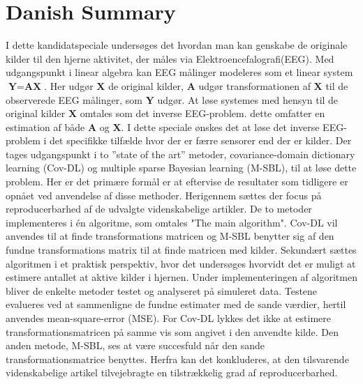 \chapter*{Danish Summary}
I dette kandidatspeciale undersøges det hvordan man kan genskabe de originale kilder til den hjerne aktivitet, der måles via Elektroencefalografi(EEG). Med udgangspunkt i linear algebra kan EEG målinger modeleres som et linear system $\textbf{Y}=\textbf{AX}$. Her udgør $\textbf{X}$ de original kilder, $\textbf{A}$ udgør transformationen af $\textbf{X}$ til de observerede EEG målinger, som $\textbf{Y}$ udgør.   
At løse systemes med hensyn til de original kilder $\textbf{X}$
omtales som det inverse EEG-problem. dette omfatter en estimation af både $\textbf{A}$ og $\textbf{X}$.
I dette speciale ønskes det at løse det inverse EEG-problem i det specifikke tilfælde hvor der er færre sensorer end der er kilder.  Der tages udgangspunkt i to ”state of the art” metoder, covariance-domain dictionary learning (Cov-DL) og multiple sparse Bayesian learning (M-SBL), til at løse dette problem. Her er det primære formål er at eftervise de resultater som tidligere er opnået ved anvendelse af disse methoder. Herigennem sættes der focus på reproducerbarhed af de udvalgte videnskabelige artikler.  
De to metoder implementeres i én algoritme, som omtales "The main algorithm". 
Cov-DL vil anvendes til at finde transformations matricen og M-SBL benytter sig af den fundne transformations matrix til at finde matricen med kilder. 
Sekundært sættes algoritmen i et praktisk perspektiv, hvor det undersøges hvorvidt det er muligt at estimere antallet at aktive kilder i hjernen.
Under implementeringen af algoritmen bliver de enkelte metoder testet og analyseret på simuleret data. Testene evalueres ved at sammenligne de fundne estimater med de sande værdier, hertil anvendes mean-square-error (MSE). For Cov-DL lykkes det ikke at estimere transformationsmatricen på samme vis som angivet i den anvendte kilde.
Den anden metode, M-SBL, ses at være succesfuld når den sande transformationsmatrice benyttes. Herfra kan det konkluderes, at den tilsvarende videnskabelige artikel tilvejebragte en tilstrækkelig grad af reproducerbarhed.

